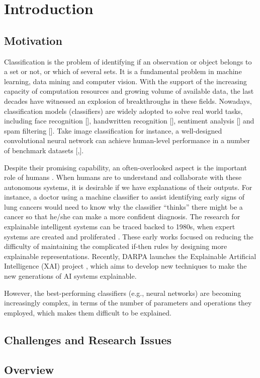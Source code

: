 \chapter{Introduction}\label{sec-introduction}

\section{Motivation}


Classification is the problem of identifying if an observation or object belongs to a set or not, or which of several sets. It is a fundamental problem in machine learning, data mining and computer vision. With the support of the increasing capacity of computation resources and growing volume of available data, the last decades have witnessed an explosion of breakthroughs in these fields. Nowadays, classification models (classifiers) are widely adopted to solve real world tasks, including face recognition [], handwritten recognition [], sentiment analysis [] and spam filtering []. Take image classification for instance, a well-designed convolutional neural network can achieve human-level performance in a number of benchmark datasets [,]. 

Despite their promising capability, an often-overlooked aspect is the important role of humans \cite{ribeiro2016kdd}. When humans are to understand and collaborate with these autonomous systems, it is desirable if we have explanations of their outputs. For instance, a doctor using a machine classifier to assist identifying early signs of lung cancers would need to know why the classifier ``thinks'' there might be a cancer so that he/she can make a more confident diagnosis. The research for explainable intelligent systems can be traced backed to 1980s, when expert systems are created and proliferated \cite{clancey1981tech, neches1985tse, swartout1991expert}. These early works focused on reducing the difficulty of maintaining the complicated if-then rules by designing more explainable representations. Recently, DARPA launches the Explainable Artificial Intelligence (XAI) project \cite{darpa2017xai}, which aims to develop new techniques to make the new generations of AI systems explainable.

However, the best-performing classifiers (e.g., neural networks) are becoming increasingly complex, in terms of the number of parameters and operations they employed, which makes them difficult to be explained. 



\section{Challenges and Research Issues}


\section{Overview}


\newpage
